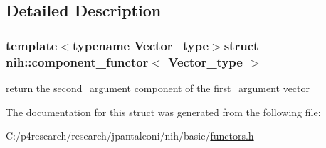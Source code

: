 \subsection{\-Detailed \-Description}
\subsubsection*{template$<$typename Vector\-\_\-type$>$struct nih\-::component\-\_\-functor$<$ Vector\-\_\-type $>$}

return the second\-\_\-argument component of the first\-\_\-argument vector 

\-The documentation for this struct was generated from the following file\-:\begin{DoxyCompactItemize}
\item 
\-C\-:/p4research/research/jpantaleoni/nih/basic/\hyperlink{functors_8h}{functors.\-h}\end{DoxyCompactItemize}
